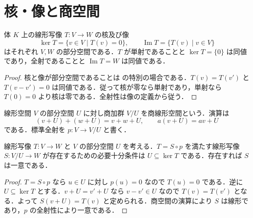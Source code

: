 \section{核・像と商空間}
\begin{prop}[線形写像の核と像]
体 $K$ 上の線形写像 $T:V\to W$ の核及び像
\[
 \ker T=\{v\in V\mid T(v)=0\},\qquad
 \operatorname{Im}T=\{T(v)\mid v\in V\}
\]
はそれぞれ $V,W$ の部分空間である．$T$ が単射であることと $\ker T=\{0\}$ は同値であり，全射であることと $\operatorname{Im}T=W$ は同値である．
\end{prop}
\begin{proof}
核と像が部分空間であることは の特別の場合である．$T(v)=T(v')$ と $T(v-v')=0$ は同値である．従って核が零なら単射であり，単射なら $T(0)=0$ より核は零である．全射性は像の定義から従う．
\end{proof}
\begin{defn}[商線形空間]
線形空間 $V$ の部分空間 $U$ に対し商加群 $V/U$ を商線形空間という．演算は
\[
 (v+U)+(w+U)=v+w+U,\qquad a(v+U)=av+U
\]
である．標準全射を $p:V\to V/U$ と書く．
\end{defn}
\begin{prop}[商線形空間の普遍性]
線形写像 $T:V\to W$ と $V$ の部分空間 $U$ を考える．$T=S\circ p$ を満たす線形写像 $S:V/U\to W$ が存在するための必要十分条件は $U\subseteq\ker T$ である．存在すれば $S$ は一意である．
\end{prop}
\begin{proof}
$T=S\circ p$ なら $u\in U$ に対し $p(u)=0$ なので $T(u)=0$ である．逆に $U\subseteq\ker T$ とする．$v+U=v'+U$ なら $v-v'\in U$ なので $T(v)=T(v')$ となる．よって $S(v+U)=T(v)$ と定められる．商空間の演算により $S$ は線形であり，$p$ の全射性により一意である．
\end{proof}
